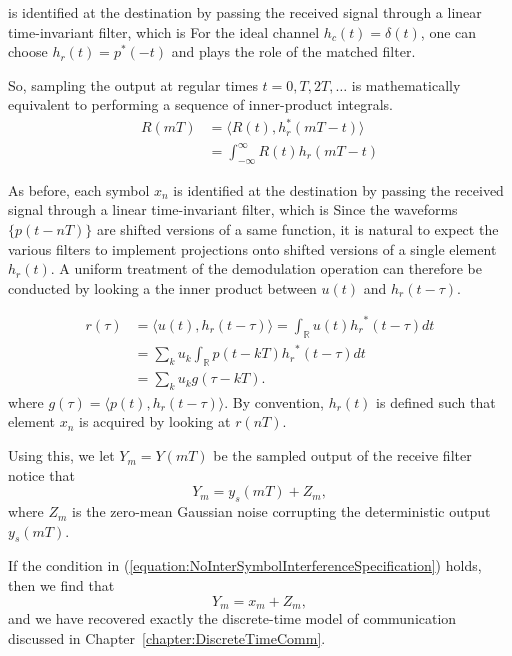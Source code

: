 is identified at the destination by passing the received signal through a linear time-invariant filter, which is 
For the ideal channel $h_c(t) = \delta(t)$, one can choose $h_r (t) = p^* (-t)$
 and plays the role of the matched filter.

So, sampling the output at regular times $t=0,T,2T,\ldots$ is mathematically equivalent to performing a sequence of inner-product integrals.
\begin{align*}
R(mT)
&= \langle R(t), h_{r}^* (mT-t) \rangle \\
&= \int_{-\infty}^{\infty} R(t) h_{r} (mT-t)
\end{align*}

As before, each symbol $x_n$ is identified at the destination by passing the received signal through a linear time-invariant filter, which is 
Since the waveforms $\{ p(t-nT) \}$ are shifted versions of a same function, it is natural to expect the various filters to implement projections onto shifted versions of a single element $h_r (t)$.
A uniform treatment of the demodulation operation can therefore be conducted by looking a the inner product between $u(t)$ and $h_r (t-\tau)$.

\begin{equation} \label{equation:InnerProductReceiver}
\begin{split}
r(\tau) &= \langle u(t), h_r (t-\tau) \rangle
= \int_{\mathbb{R}} u(t) {h_r}^*(t-\tau) dt \\
&= \sum_{k} u_k \int_{\mathbb{R}} p(t - kT) {h_r}^*(t-\tau) dt \\
&= \sum_{k} u_k g(\tau - kT) .
\end{split}
\end{equation}
where $g(\tau) = \langle p(t), h_r (t-\tau) \rangle$.
By convention, $h_r (t)$ is defined such that element $x_n$ is acquired by looking at $r(nT)$.
\iffalse
The random portion $r_n (t)$ of the received waveform is defined by
\[ r_n (t) = \int_{-\infty}^{\infty} N(t-\tau) h_r (\tau) d \tau. \]
\fi

Using this, we let $Y_m = Y(mT)$ be the sampled output of the receive filter notice that
\[ Y_m = y_s (mT) + Z_m, \]
where $Z_m$ is the zero-mean Gaussian noise corrupting the deterministic output $y_s (mT)$.
\begin{example}
If the condition in (\ref{equation:NoInterSymbolInterferenceSpecification}) holds, then we find that
\[ Y_m = x_m + Z_m, \]
and we have recovered exactly the discrete-time model of communication discussed in Chapter~\ref{chapter:DiscreteTimeComm}.
\end{example}
\fi


